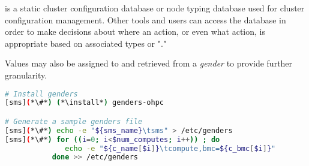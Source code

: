 \genders{} is a static cluster configuration database or node typing database
used for cluster configuration management. Other tools and users can access the
\genders{} database in order to make decisions about where an action, or even
what action, is appropriate based on associated types or "\genders{}."

Values may also be assigned to and retrieved from a {\em gender} to provide
further granularity.

\begin{lstlisting}[language=bash,keywords={},upquote=true]
# Install genders
[sms](*\#*) (*\install*) genders-ohpc

# Generate a sample genders file
[sms](*\#*) echo -e "${sms_name}\tsms" > /etc/genders
[sms](*\#*) for ((i=0; i<$num_computes; i++)) ; do
              echo -e "${c_name[$i]}\tcompute,bmc=${c_bmc[$i]}"
           done >> /etc/genders
\end{lstlisting}

